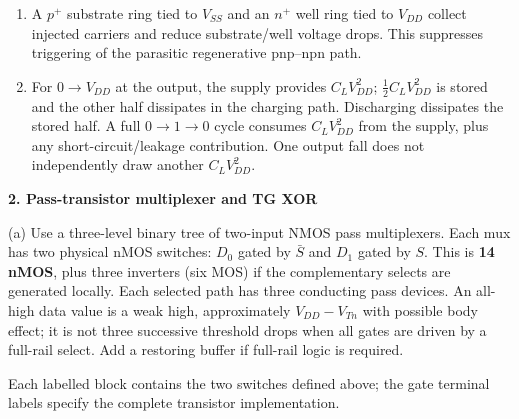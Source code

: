 \documentclass[10pt]{article}
\begin{document}
\begin{enumerate}[label=(\alph*),leftmargin=7mm]
\[V_T=V_{T0}+\gamma\bigl(\sqrt{2\phi_F+V_{SB}}-\sqrt{2\phi_F}\bigr).\]
The effective source is the lower-potential channel terminal for NMOS; a pass-device source need not be the left terminal.
\item A $p^+$ substrate ring tied to $V_{SS}$ and an $n^+$ well ring tied to $V_{DD}$ collect injected carriers and reduce substrate/well voltage drops. This suppresses triggering of the parasitic regenerative pnp--npn path.
\item For $0\to V_{DD}$ at the output, the supply provides $C_LV_{DD}^2$; $\tfrac12C_LV_{DD}^2$ is stored and the other half dissipates in the charging path. Discharging dissipates the stored half. A full $0\to1\to0$ cycle consumes $C_LV_{DD}^2$ from the supply, plus any short-circuit/leakage contribution. One output fall does not independently draw another $C_LV_{DD}^2$.
\end{enumerate}
\newpage
\textbf{2. Pass-transistor multiplexer and TG XOR}

(a) Use a three-level binary tree of two-input NMOS pass multiplexers. Each mux has two physical nMOS switches: $D_0$ gated by $\bar S$ and $D_1$ gated by $S$. This is \textbf{14 nMOS}, plus three inverters (six MOS) if the complementary selects are generated locally. Each selected path has three conducting pass devices. An all-high data value is a weak high, approximately $V_{DD}-V_{Tn}$ with possible body effect; it is not three successive threshold drops when all gates are driven by a full-rail select. Add a restoring buffer if full-rail logic is required.
\begin{center}\end{center}
Each labelled block contains the two switches defined above; the gate terminal labels specify the complete transistor implementation.
\end{document}
